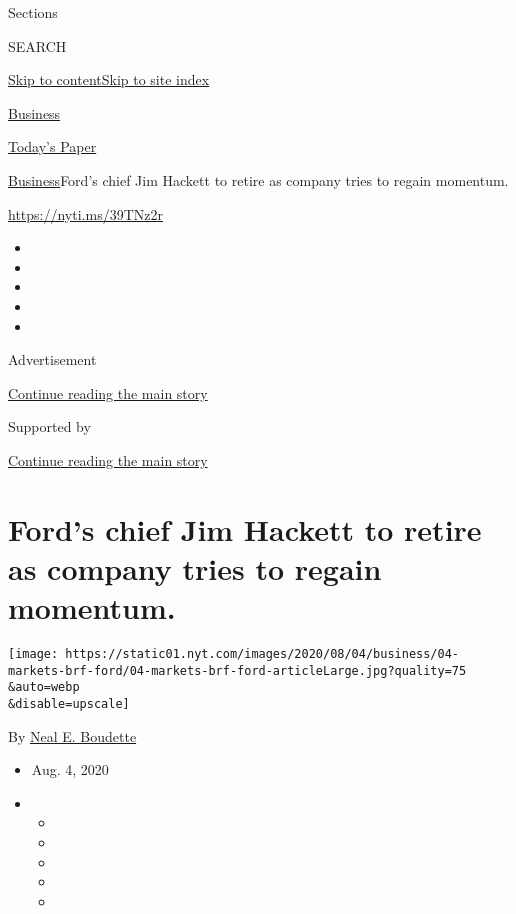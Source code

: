 Sections

SEARCH

\protect\hyperlink{site-content}{Skip to
content}\protect\hyperlink{site-index}{Skip to site index}

\href{https://www.nytimes.com/section/business}{Business}

\href{https://myaccount.nytimes.com/auth/login?response_type=cookie\&client_id=vi}{}

\href{https://www.nytimes.com/section/todayspaper}{Today's Paper}

\href{/section/business}{Business}\textbar{}Ford's chief Jim Hackett to
retire as company tries to regain momentum.

\url{https://nyti.ms/39TNz2r}

\begin{itemize}
\item
\item
\item
\item
\item
\end{itemize}

Advertisement

\protect\hyperlink{after-top}{Continue reading the main story}

Supported by

\protect\hyperlink{after-sponsor}{Continue reading the main story}

\hypertarget{fords-chief-jim-hackett-to-retire-as-company-tries-to-regain-momentum}{%
\section{Ford's chief Jim Hackett to retire as company tries to regain
momentum.}\label{fords-chief-jim-hackett-to-retire-as-company-tries-to-regain-momentum}}

\texttt{[image: https://static01.nyt.com/images/2020/08/04/business/04-markets-brf-ford/04-markets-brf-ford-articleLarge.jpg?quality=75\\\&auto=webp\\\&disable=upscale]}

By \href{https://www.nytimes.com/by/neal-e-boudette}{Neal E. Boudette}

\begin{itemize}
\item
  Aug. 4, 2020
\item
  \begin{itemize}
  \item
  \item
  \item
  \item
  \item
  \end{itemize}
\end{itemize}

